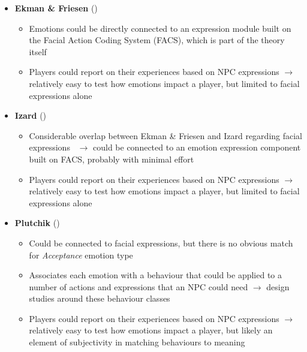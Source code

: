 \begin{itemize}
    \item \textbf{Ekman \& Friesen} (\good)
    \begin{itemize}
        \item Emotions could be directly connected to an expression module
        built on the Facial Action Coding System (FACS), which is part of the
        theory itself~\citep{facs}

        \item Players could report on their experiences based on NPC
        expressions $\rightarrow$ relatively easy to test how emotions impact a
        player, but limited to facial expressions alone
    \end{itemize}

    \item \textbf{Izard} (\good)
    \begin{itemize}
        \item Considerable overlap between Ekman \& Friesen and Izard regarding
        facial expressions~\citep[p.~3]{ekman2007emotions} $\rightarrow$ could
        be connected to an emotion expression component built on FACS, probably
        with minimal effort

        \item Players could report on their experiences based on NPC
        expressions $\rightarrow$ relatively easy to test how emotions impact a
        player, but limited to facial expressions alone
    \end{itemize}

    \item \textbf{Plutchik} (\good)
    \begin{itemize}
        \item Could be connected to facial expressions, but there is no obvious
        match for \textit{Acceptance} emotion type

        \item Associates each emotion with a behaviour that could be applied to
        a number of actions and expressions that an NPC could need
        $\rightarrow$ design studies around these behaviour classes

        \item Players could report on their experiences based on NPC
        expressions $\rightarrow$ relatively easy to test how emotions impact a
        player, but likely an element of subjectivity in matching behaviours to
        meaning
    \end{itemize}
\end{itemize}

